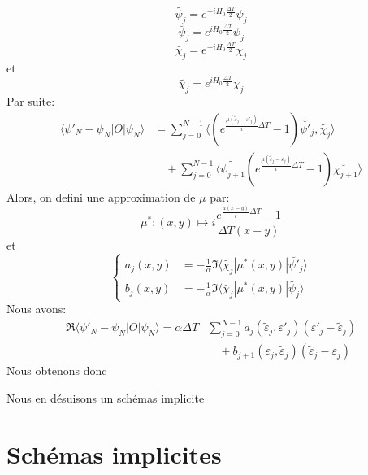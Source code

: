 \begin{equation}
\tilde{\psi_j} = e^{-iH_0 \frac{\Delta T}{2}} \psi_j
\end{equation}
\begin{equation}
\breve{\psi_j} = e^{iH_0 \frac{\Delta T}{2}} \psi_j
\end{equation}
\begin{equation}
\breve{\chi_j} = e^{-iH_0 \frac{\Delta T}{2}} \chi_j
\end{equation}
et
\begin{equation}
\tilde{\chi_j} = e^{iH_0 \frac{\Delta T}{2}} \chi_j
\end{equation}
Par suite:
\begin{align*}
\langle \psi'_N-\psi_N |O|\psi_N \rangle &= \sum_{j=0}^{N-1} \langle (e^{\frac{\mu(\tilde{\varepsilon}_j-\varepsilon'_j)}{i}\Delta T}-1)\breve{\psi'_j} , \tilde{\chi_j} \rangle\\
&\quad +\sum_{j=0}^{N-1} \langle \tilde{\psi_{j+1}} (e^{\frac{\mu(\tilde{\varepsilon}_j-\varepsilon_j)}{i}\Delta T}-1)\breve{\chi_{j+1}} \rangle
\end{align*}
Alors, on defini une approximation de $\mu$ par:
\begin{equation}
\mu^*:(x,y) \mapsto i\dfrac{e^{\frac{\mu (x-y)}{i}\Delta T }-1}{\Delta T (x-y)}
\end{equation}
et
\begin{equation}
\begin{cases}
a_j(x,y) &=-\frac{1}{\alpha} \Im \langle \tilde{\chi_j}|\mu^*(x,y)|\breve{\psi'_j} \rangle \\
b_j(x,y) &= -\frac{1}{\alpha} \Im \langle \breve{\chi_j}|\mu^*(x,y)|\tilde{\psi_j} \rangle
\end{cases}
\end{equation}
Nous avons:
\begin{align*}
\Re \langle \psi'_N-\psi_N |O|\psi_N \rangle = \alpha \Delta T &\sum_{j=0}^{N-1} a_j (\tilde{\varepsilon}_j,\varepsilon'_j)(\varepsilon'_j- \tilde{\varepsilon}_j)\\
&\quad +b_{j+1} (\varepsilon_j,\tilde{\varepsilon}_j)(\tilde{\varepsilon}_j-\varepsilon_j)
\end{align*}
Nous obtenons donc

Nous en désuisons un schémas implicite

\section{Schémas implicites}

